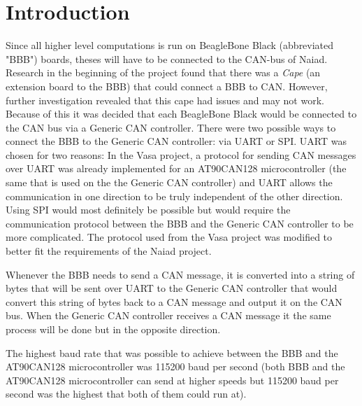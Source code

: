 
\section{Introduction}\label{sec:introduction}
Since all higher level computations is run on BeagleBone Black (abbreviated "BBB") boards, theses will have to be connected to the CAN-bus of Naiad. Research in the beginning of the project found that there was a \emph{Cape} (an extension board to the BBB) that could connect a BBB to CAN. However, further investigation revealed that this cape had issues and may not work. Because of this it was decided that each BeagleBone Black would be connected to the CAN bus via a Generic CAN controller. \newline
There were two possible ways to connect the BBB to the Generic CAN controller: via UART or SPI. UART was chosen for two reasons: In the Vasa project, a protocol for sending CAN messages over UART was already implemented for an AT90CAN128 microcontroller (the same that is used on the the Generic CAN controller) and UART allows the communication in one direction to be truly independent of the other direction. Using SPI would most definitely be possible but would require the communication protocol between the BBB and the Generic CAN controller to be more complicated.  \newline
The protocol used from the Vasa project was modified to better fit the requirements of the Naiad project.

Whenever the BBB needs to send a CAN message, it is converted into a string of bytes that will be sent over UART to the Generic CAN controller that would convert this string of bytes back to a CAN message and output it on the CAN bus. When the Generic CAN controller receives a CAN message it the same process will be done but in the opposite direction. 

The highest baud rate that was possible to achieve between the BBB and the AT90CAN128 microcontroller was 115200 baud per second (both BBB and the AT90CAN128 microcontroller can send at higher speeds but 115200 baud per second was the highest that both of them could run at). 